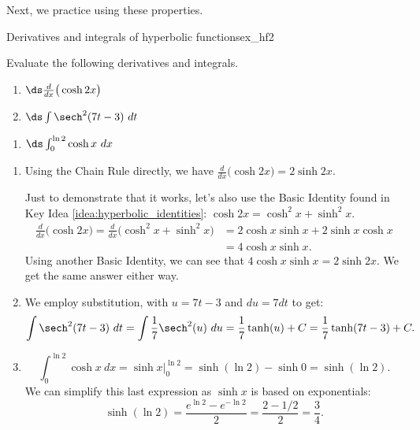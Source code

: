 Next, we practice using these properties.\\

\begin{example}{Derivatives and integrals of hyperbolic functions}{ex_hf2}
{
Evaluate the following derivatives and integrals.

\begin{minipage}[t]{.5\linewidth}
\begin{enumerate}
\item		$\ds\frac{d}{dx}\big(\cosh 2x\big)$
\item		$\ds\int \sech^2(7t-3)\ dt$
\end{enumerate}
\end{minipage}
\begin{minipage}[t]{.5\linewidth}
\begin{enumerate}\addtocounter{enumi}{2}
\item		$\ds \int_0^{\ln 2} \cosh x\ dx$
\end{enumerate}
\end{minipage}
}
\end{example}


\begin{solution}
{\begin{enumerate}
\item		Using the Chain Rule directly, we have $\frac{d}{dx} \big(\cosh 2x\big) = 2\sinh 2x$.

Just to demonstrate that it works, let's also use the Basic Identity found in Key Idea \ref{idea:hyperbolic_identities}: $\cosh 2x = \cosh^2x+\sinh^2x$.
\begin{align*}\frac{d}{dx}\big(\cosh 2x\big) = \frac{d}{dx}\big(\cosh^2x+\sinh^2x\big) &= 2\cosh x\sinh x+ 2\sinh x\cosh x\\ &= 4\cosh x\sinh x.
\end{align*}
Using another Basic Identity, we can see that $4\cosh x\sinh x = 2\sinh 2x$. We get the same answer either way.

\item	  We employ substitution, with $u = 7t-3$ and $du = 7dt$ to get:
$$ \int \sech^2 (7t-3)\ dt =\int \frac{1}{7}\sech^2 (u)\ du= \frac17\tanh (u) + C = \frac17\tanh (7t-3) + C.$$

\item		$$\int_0^{\ln 2} \cosh x\ dx = \sinh x\Big|_0^{\ln 2} = \sinh (\ln 2) - \sinh 0 = \sinh(\ln 2).$$
We can simplify this last expression as $\sinh x$ is based on exponentials:
$$\sinh(\ln 2) = \frac{e^{\ln 2}-e^{-\ln 2}}2 = \frac{2-1/2}{2} = \frac34.$$
\end{enumerate}
\baselineskip
}
\end{solution}





